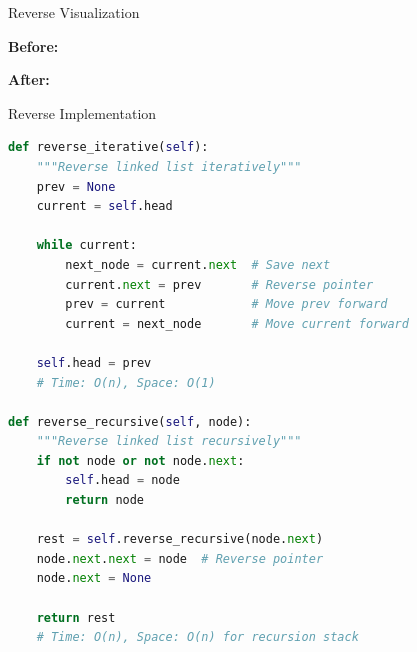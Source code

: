 \documentclass[aspectratio=169,xcolor=dvipsnames]{beamer}
\begin{document}
\begin{frame}{Reverse Visualization}
  \begin{center}
    \textbf{Before:}

    \vspace{0.5cm}
    \textbf{After:}
  \end{center}
\end{frame}

\begin{frame}[fragile]{Reverse Implementation}
\begin{lstlisting}[language=Python, basicstyle=\small\ttfamily]
def reverse_iterative(self):
    """Reverse linked list iteratively"""
    prev = None
    current = self.head

    while current:
        next_node = current.next  # Save next
        current.next = prev       # Reverse pointer
        prev = current            # Move prev forward
        current = next_node       # Move current forward

    self.head = prev
    # Time: O(n), Space: O(1)

def reverse_recursive(self, node):
    """Reverse linked list recursively"""
    if not node or not node.next:
        self.head = node
        return node

    rest = self.reverse_recursive(node.next)
    node.next.next = node  # Reverse pointer
    node.next = None

    return rest
    # Time: O(n), Space: O(n) for recursion stack
\end{lstlisting}
\end{frame}
\end{document}
